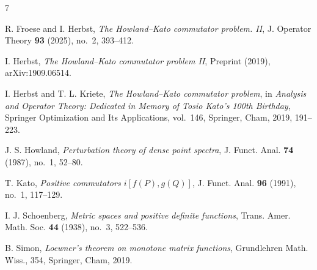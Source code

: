\documentclass[11pt]{article}
\theoremstyle{definition}
\theoremstyle{remark}
\begin{document}


\begin{thebibliography}{7}

R. Froese and I. Herbst,
\emph{The Howland--Kato commutator problem. II},
J. Operator Theory \textbf{93} (2025), no.~2, 393--412.

I. Herbst,
\emph{The Howland--Kato commutator problem II},
Preprint (2019), arXiv:1909.06514.

I. Herbst and T. L. Kriete,
\emph{The Howland--Kato commutator problem},
in \emph{Analysis and Operator Theory: Dedicated in Memory of Tosio Kato's 100th Birthday},
Springer Optimization and Its Applications, vol.~146, Springer, Cham, 2019, 191--223.

J. S. Howland,
\emph{Perturbation theory of dense point spectra},
J. Funct. Anal. \textbf{74} (1987), no.~1, 52--80.

T. Kato,
\emph{Positive commutators $i[f(P),g(Q)]$},
J. Funct. Anal. \textbf{96} (1991), no.~1, 117--129.

I. J. Schoenberg,
\emph{Metric spaces and positive definite functions},
Trans. Amer. Math. Soc. \textbf{44} (1938), no.~3, 522--536.


B. Simon,
\emph{Loewner's theorem on monotone matrix functions},
Grundlehren Math. Wiss., 354,
Springer, Cham, 2019.

\end{thebibliography}
\end{document}
